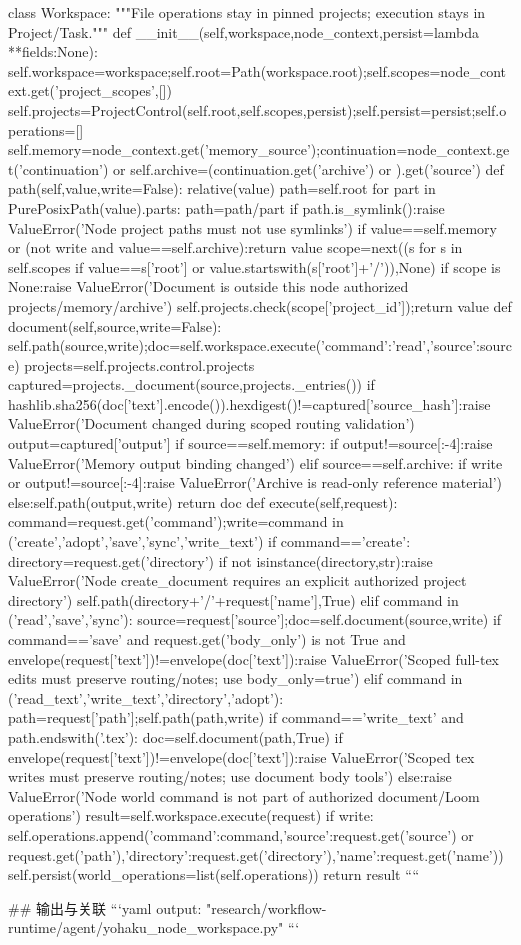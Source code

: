 class Workspace:
 """File operations stay in pinned projects; execution stays in Project/Task."""
 def __init__(self,workspace,node_context,persist=lambda **fields:None):
  self.workspace=workspace;self.root=Path(workspace.root);self.scopes=node_context.get('project_scopes',[])
  self.projects=ProjectControl(self.root,self.scopes,persist);self.persist=persist;self.operations=[]
  self.memory=node_context.get('memory_source');continuation=node_context.get('continuation') or {}
  self.archive=(continuation.get('archive') or {}).get('source')
 def path(self,value,write=False):
  relative(value)
  path=self.root
  for part in PurePosixPath(value).parts:
   path=path/part
   if path.is_symlink():raise ValueError('Node project paths must not use symlinks')
  if value==self.memory or (not write and value==self.archive):return value
  scope=next((s for s in self.scopes if value==s['root'] or value.startswith(s['root']+'/')),None)
  if scope is None:raise ValueError('Document is outside this node authorized projects/memory/archive')
  self.projects.check(scope['project_id']);return value
 def document(self,source,write=False):
  self.path(source,write);doc=self.workspace.execute({'command':'read','source':source})
  projects=self.projects.control.projects
  captured=projects._document(source,projects._entries())
  if hashlib.sha256(doc['text'].encode()).hexdigest()!=captured['source_hash']:raise ValueError('Document changed during scoped routing validation')
  output=captured['output']
  if source==self.memory:
   if output!=source[:-4]:raise ValueError('Memory output binding changed')
  elif source==self.archive:
   if write or output!=source[:-4]:raise ValueError('Archive is read-only reference material')
  else:self.path(output,write)
  return doc
 def execute(self,request):
  command=request.get('command');write=command in ('create','adopt','save','sync','write_text')
  if command=='create':
   directory=request.get('directory')
   if not isinstance(directory,str):raise ValueError('Node create_document requires an explicit authorized project directory')
   self.path(directory+'/'+request['name'],True)
  elif command in ('read','save','sync'):
   source=request['source'];doc=self.document(source,write)
   if command=='save' and request.get('body_only') is not True and envelope(request['text'])!=envelope(doc['text']):raise ValueError('Scoped full-tex edits must preserve routing/notes; use body_only=true')
  elif command in ('read_text','write_text','directory','adopt'):
   path=request['path'];self.path(path,write)
   if command=='write_text' and path.endswith('.tex'):
    doc=self.document(path,True)
    if envelope(request['text'])!=envelope(doc['text']):raise ValueError('Scoped tex writes must preserve routing/notes; use document body tools')
  else:raise ValueError('Node world command is not part of authorized document/Loom operations')
  result=self.workspace.execute(request)
  if write:
   self.operations.append({'command':command,'source':request.get('source') or request.get('path'),'directory':request.get('directory'),'name':request.get('name')})
   self.persist(world_operations=list(self.operations))
  return result
````

## 输出与关联
```yaml
output: "research/workflow-runtime/agent/yohaku_node_workspace.py"
```
